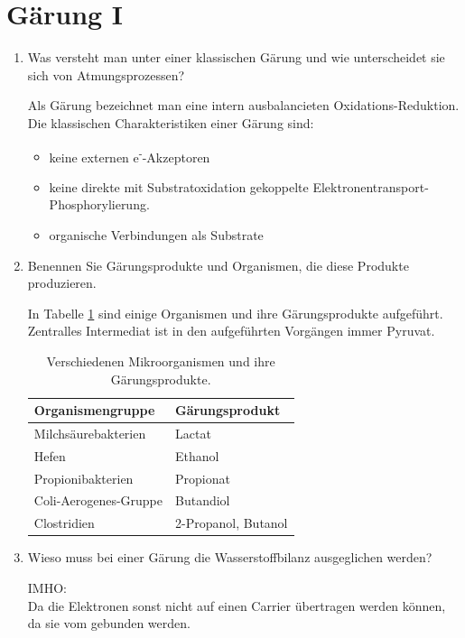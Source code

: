 
\section{Gärung I}
\begin{enumerate}
	\item Was versteht man unter einer klassischen Gärung und wie unterscheidet sie sich von Atmungsprozessen?
	
		Als Gärung bezeichnet man eine intern ausbalancieten Oxidations-Reduktion.
		Die klassischen Charakteristiken einer Gärung sind:
		\begin{itemize}
			\item keine externen e\textsuperscript{-}-Akzeptoren
			\item keine direkte mit Substratoxidation gekoppelte Elektronentransport-Phosphorylierung.
			\item organische Verbindungen als Substrate
		\end{itemize}

	\item Benennen Sie Gärungsprodukte und Organismen, die diese Produkte produzieren.
		
		In Tabelle \ref{tab:gaerungsprodukte} sind einige Organismen und ihre Gärungsprodukte aufgeführt.
		Zentralles Intermediat ist in den aufgeführten Vorgängen immer Pyruvat.
		\begin{table}[h!]
		\begin{center}
		\begin{tabular}{l l} 
		\toprule
			Organismengruppe			&	Gärungsprodukt\\
			\midrule
			Milchsäurebakterien		&	Lactat\\
			Hefen							&	Ethanol\\
			Propionibakterien			&	Propionat\\
			Coli-Aerogenes-Gruppe	&	Butandiol\\
			Clostridien					&	2-Propanol, Butanol\\
		\bottomrule
		\end{tabular}
		\caption{Verschiedenen Mikroorganismen und ihre Gärungsprodukte.}
		\label{tab:gaerungsprodukte}
		\end{center}
		\end{table}

	\item Wieso muss bei einer Gärung die Wasserstoffbilanz ausgeglichen werden?
		
		IMHO:\\
		Da die Elektronen sonst nicht auf einen Carrier übertragen werden können,
		da sie vom  gebunden werden.		%


\end{enumerate}
